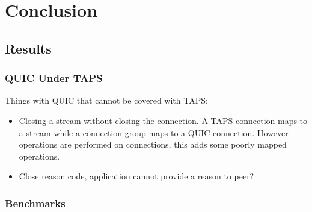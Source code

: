 \part{Conclusion}                     %
\chapter{Results}                     %
\section{QUIC Under TAPS}
Things with QUIC that cannot be covered with TAPS:
\begin{itemize}
    \item Closing a stream without closing the connection. A TAPS connection maps to a stream while a connection group maps to a QUIC connection. However operations are performed on connections, this adds some poorly mapped operations.
    \item Close reason code, application cannot provide a reason to peer?
\end{itemize}
\section{Benchmarks}

